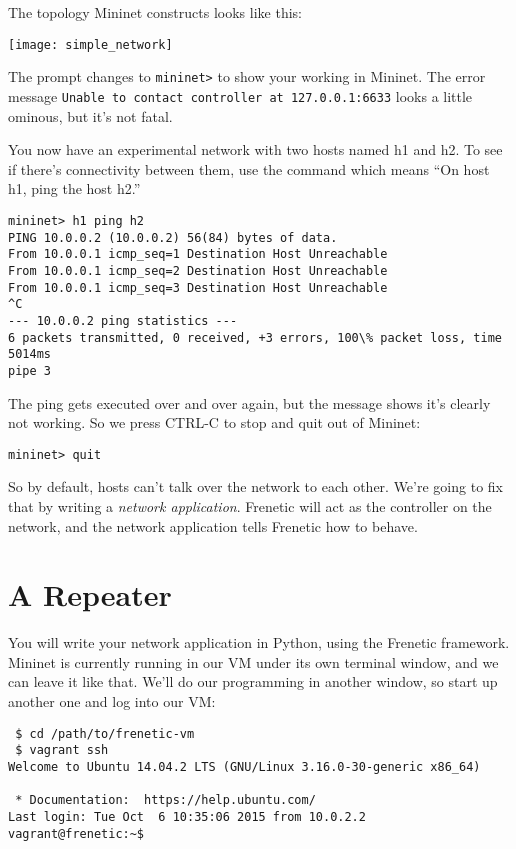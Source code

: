 The topology Mininet constructs looks like this:

\texttt{[image: simple\_network]}

The prompt changes to {\tt mininet>} to show your working in Mininet.  
The error message {\tt Unable to contact controller at 127.0.0.1:6633} looks a little ominous, but it's not fatal.  

You now have an experimental network with two hosts named h1 and h2.  
To see if there's connectivity between them, use the command  which means 
``On host h1, ping the host h2.''

\begin{verbatim}
mininet> h1 ping h2
PING 10.0.0.2 (10.0.0.2) 56(84) bytes of data.
From 10.0.0.1 icmp_seq=1 Destination Host Unreachable
From 10.0.0.1 icmp_seq=2 Destination Host Unreachable
From 10.0.0.1 icmp_seq=3 Destination Host Unreachable
^C
--- 10.0.0.2 ping statistics ---
6 packets transmitted, 0 received, +3 errors, 100\% packet loss, time 5014ms
pipe 3
\end{verbatim}

The ping gets executed over and over again, but the  message
shows it's clearly not working.  So we press CTRL-C to stop and 
quit out of Mininet:

\begin{verbatim}
mininet> quit
\end{verbatim}

So by default, hosts can't talk over the network to each other.  We're going to fix that by writing a {\it network
application}.    Frenetic will act as the controller on the network, and the network application tells 
Frenetic how to behave.

\section{A Repeater}

You will write your network application in Python, using the Frenetic framework.  
Mininet is currently running in our VM under its own terminal window, and we can leave it like that.   
We'll do our programming in another window, so start up another one and log into our VM:

\begin{verbatim}
 $ cd /path/to/frenetic-vm
 $ vagrant ssh
Welcome to Ubuntu 14.04.2 LTS (GNU/Linux 3.16.0-30-generic x86_64)

 * Documentation:  https://help.ubuntu.com/
Last login: Tue Oct  6 10:35:06 2015 from 10.0.2.2
vagrant@frenetic:~$ 
\end{verbatim}

